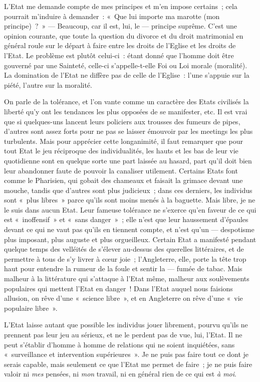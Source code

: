 \documentclass[french,twoside]{book} %
\begin{document}
L’Etat me demande compte de mes principes et m’en impose certains ; cela pourrait m’induire à demander : « Que lui importe ma marotte (mon principe) ? » — Beaucoup, car il est, lui, le — principe suprême. C’est une opinion courante, que toute la question du divorce et du droit matrimonial en général roule sur le départ à faire entre les droits de l’Eglise et les droits de l’Etat. Le problème est plutôt celui-ci : étant donné que l’homme doit être gouverné par une Sainteté, celle-ci s’appelle-t-elle Foi ou Loi morale (moralité). La domination de l’Etat ne diffère pas de celle de l’Eglise : l’une s’appuie sur la piété, l’autre sur la moralité.\par
On parle de la tolérance, et l’on vante comme un caractère des Etats civilisés la liberté qu’y ont les tendances les plus opposées de se manifester, etc. Il est vrai que si quelques-uns lancent leurs policiers aux trousses des fumeurs de pipes, d’autres sont assez forts pour ne pas se laisser émouvoir par les meetings les plus turbulents. Mais pour apprécier cette longanimité, il faut remarquer que pour tout Etat le jeu réciproque des individualités, les hauts et les bas de leur vie quotidienne sont en quelque sorte une part laissée au hasard, part qu’il doit bien leur abandonner faute de pouvoir la canaliser utilement. Certains Etats font comme le Pharisien, qui gobait des chameaux et faisait la grimace devant une mouche, tandis que d’autres sont plus judicieux ; dans ces derniers, les individus sont « plus libres » parce qu’ils sont moins menés à la baguette. Mais libre, je ne le suis dans aucun Etat. Leur fameuse tolérance ne s’exerce qu’en faveur de ce qui est « inoffensif » et « sans danger » ; elle n’est que leur haussement d’épaules devant ce qui ne vaut pas qu’ils en tiennent compte, et n’est qu’un — despotisme plus imposant, plus auguste et plus  orgueilleux. Certain Etat a manifesté pendant quelque temps des velléités de s’élever au-dessus des querelles littéraires, et de permettre à tous de s’y livrer à cœur joie ; l’Angleterre, elle, porte la tête trop haut pour entendre la rumeur de la foule et sentir la — fumée de tabac. Mais malheur à la littérature qui s’attaque à l’Etat même, malheur aux soulèvements populaires qui mettent l’Etat en danger ! Dans l’Etat auquel nous faisions allusion, on rêve d’une « science libre », et en Angleterre on rêve d’une « vie populaire libre ».\par
L’Etat laisse autant que possible les individus jouer librement, pourvu qu’ils ne prennent pas leur jeu au sérieux, et ne le perdent pas de vue, lui, l’Etat. Il ne peut s’établir d’homme à homme de relations qui ne soient inquiétées, sans « surveillance et intervention supérieures ». Je ne puis pas faire tout ce dont je serais capable, mais seulement ce que l’Etat me permet de faire ; je ne puis faire valoir ni \emph{mes} pensées, ni \emph{mon} travail, ni en général rien de ce qui est \emph{à moi}.\par
\end{document}
